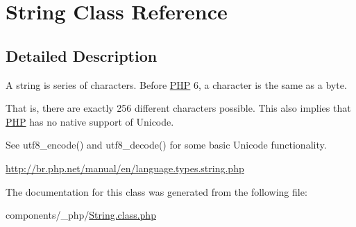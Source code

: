 \hypertarget{class_string}{
\section{String Class Reference}
\label{class_string}
}


\subsection{Detailed Description}
A string is series of characters. Before \hyperlink{namespace_p_h_p}{PHP} 6, a character is the same as a byte.

That is, there are exactly 256 different characters possible. This also implies that \hyperlink{namespace_p_h_p}{PHP} has no native support of Unicode.

See utf8\_\-encode() and utf8\_\-decode() for some basic Unicode functionality.

\hyperlink{}{http://br.php.net/manual/en/language.types.string.php}

The documentation for this class was generated from the following file:\begin{CompactItemize}
\item 
components/\_\-php/\hyperlink{_string_8class_8php}{String.class.php}\end{CompactItemize}
